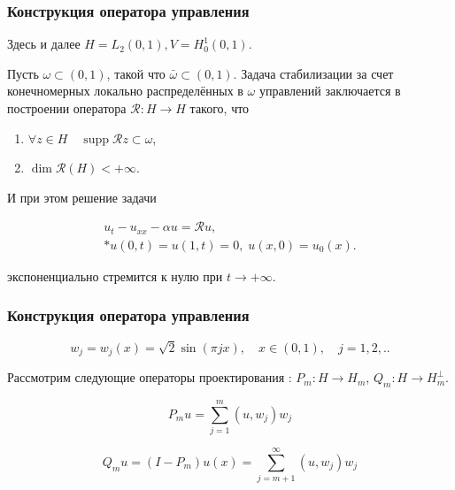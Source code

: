 \documentclass{beamer}
\newcommand{\operator}[1]{\mathcal{R}{#1}}
\newcommand{\supp}{\mathop{\mathrm{supp}}}
\begin{document}
\begin{frame}
\frametitle{Конструкция оператора управления}
Здесь и далее $H = L_2(0, 1), V = H^1_0(0, 1)$.

\hspace{5mm}Пусть $\omega \subset (0, 1)$, такой что $\bar{\omega} \subset (0, 1)$. Задача стабилизации за счет конечномерных локально распределённых в $\omega$ управлений заключается в построении оператора $\mathcal{R} : H \rightarrow H$ такого, что
\begin{enumerate}
\item $\forall z \in H \quad \supp \operator{z} \subset \omega$,
\item $\dim \operator{(H)} < +\infty$.
\end{enumerate}
И при этом решение задачи 
\begin{block}{}
\begin{gather}
  u_t - u_{xx} - \alpha u = \mathcal{R}u, \\*
  u(0, t) = u(1, t) = 0, \; u(x, 0) = u_{0}(x).
\end{gather}
\end{block}
экспоненциально стремится к нулю при $t \rightarrow + \infty$.
\end{frame}


\begin{frame}
\frametitle{Конструкция оператора управления}

\begin{block}{}
\begin{equation}\label{basis}
	w_j = w_j(x) = \sqrt{2}\sin{(\pi j x)}, \quad x \in (0, 1), \quad j=1, 2,..
\end{equation}
\end{block}

Рассмотрим следующие операторы проектирования : $P_m : H \rightarrow H_m$, $Q_m : H \rightarrow H_m^{\perp}$.

\begin{block}{}
\begin{equation}
	P_m u = \sum \limits_{j=1}^{m} {(u, w_j) w_j}
\end{equation}

\begin{equation}
	Q_m u = (I - P_m)u(x) = \sum \limits_{j=m + 1}^{\infty} {(u, w_j) w_j}
\end{equation}
\end{block}

\end{frame}
\end{document}
